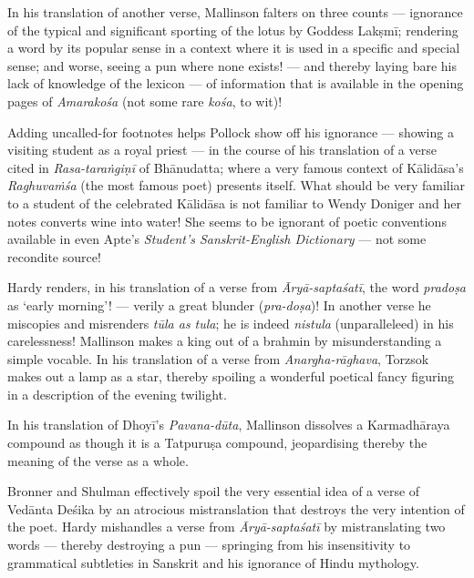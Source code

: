 In his translation of another verse, Mallinson falters on three counts --- ignorance of the typical and significant sporting of the lotus by Goddess Lakṣmī; rendering a word by its popular sense in a context where it is used in a specific and special sense; and worse, seeing a pun where none exists! --- and thereby laying bare his lack of knowledge of the lexicon --- of information that is available in the opening pages of \textsl{Amarakośa} (not some rare \textsl{kośa}, to wit)!

Adding uncalled-for footnotes helps Pollock show off his ignorance --- showing a visiting student as a royal priest --- in the course of his translation of a verse cited in \textsl{Rasa-taraṅgiṇī} of Bhānudatta; where a very famous context of Kālidāsa’s \textsl{Raghuvaṁśa} (the most famous poet) presents itself. What should be very familiar to a student of the celebrated Kālidāsa is not familiar to Wendy Doniger and her notes converts wine into water! She seems to be ignorant of poetic conventions available in even Apte’s \textsl{Student’s Sanskrit-English Dictionary} --- not some recondite source!

Hardy renders, in his translation of a verse from \textsl{Āryā-saptaśatī}, the word \textsl{pradoṣa} as ‘early morning’! --- verily a great blunder (\textsl{pra-doṣa})! In another verse he miscopies and misrenders \textsl{tūla as tula}; he is indeed \textsl{nistula} (unparalleleed) in his carelessness! Mallinson makes a king out of a brahmin by misunderstanding a simple vocable. In his translation of a verse from \textsl{Anargha-rāghava}, Torzsok makes out a lamp as a star, thereby spoiling a wonderful poetical fancy figuring in a description of the evening twilight.

\eject

In his translation of Dhoyī’s \textsl{Pavana-dūta}, Mallinson dissolves a Karmadhāraya compound as though it is a Tatpuruṣa compound, jeopardising thereby the meaning of the verse as a whole.

Bronner and Shulman effectively spoil the very essential idea of a verse of Vedānta Deśika by an atrocious mistranslation that destroys the very intention of the poet. Hardy mishandles a verse from \textsl{Āryā-saptaśatī} by mistranslating two words --- thereby destroying a pun --- springing from his insensitivity to grammatical subtleties in Sanskrit and his ignorance of Hindu mythology.

